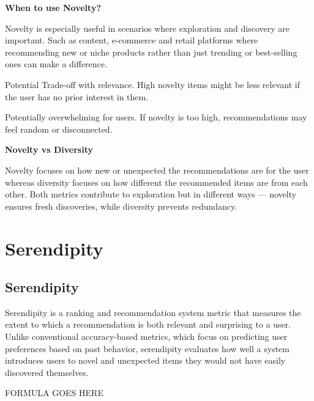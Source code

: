 \textbf{When to use Novelty?}

Novelty is especially useful in scenarios where exploration and discovery are important. Such as content, e-commerce and
retail platforms where recommending new or niche products rather than just trending or best-selling ones can make a difference.

{
    \item Potential Trade-off with relevance. High novelty items might be less relevant if the user has no prior
    interest in them.
    \item Potentially overwhelming for users. If novelty is too high, recommendations may feel random or disconnected.
}


\clearpage
\textbf{Novelty vs Diversity}

Novelty focuses on how new or unexpected the recommendations are for the user whereas diversity focuses on how different the
recommended items are from each other. Both metrics contribute to exploration but in different ways — novelty ensures
fresh discoveries, while diversity prevents redundancy.

\clearpage
\thispagestyle{rankingstyle}
\section{Serendipity}
\subsection{Serendipity}

Serendipity is a ranking and recommendation system metric that measures the extent to which a recommendation is both
relevant and surprising to a user. Unlike conventional accuracy-based metrics, which focus on predicting user preferences
based on past behavior, serendipity evaluates how well a system introduces users to novel and unexpected items they would
not have easily discovered themselves.

\begin{center}
    FORMULA GOES HERE
\end{center}

